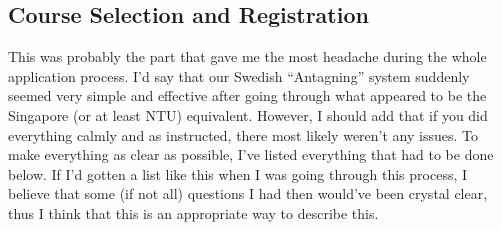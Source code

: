 \subsection*{Course Selection and Registration}
\label{courses}
This was probably the part that gave me the most headache during the whole application process. I'd say that our Swedish ``Antagning'' system suddenly seemed very simple and effective after going through what appeared to be the Singapore (or at least NTU) equivalent. However, I should add that if you did everything calmly and as instructed, there most likely weren't any issues. To make everything as clear as possible, I've listed everything that had to be done below. If I'd gotten a list like this when I was going through this process, I believe that some (if not all) questions I had then would've been crystal clear, thus I think that this is an appropriate way to describe this. 
